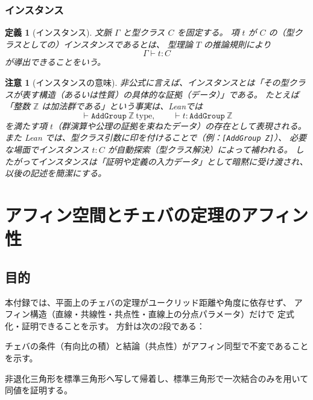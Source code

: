 \documentclass[a4paper,12pt]{bxjsbook}
\newlength{\customindent}
\newenvironment{body}{
  \par
  \begingroup
  \setlength{\leftskip}{\customindent}
  \setlength{\rightskip}{0pt}
  \setlength{\parindent}{1em}
  \setlength{\displayindent}{\customindent}
  \setlength{\displaywidth}{\dimexpr\linewidth-\customindent\relax}
}{
  \par
  \endgroup
}
\theoremstyle{theorem}
\newtheorem{definition}[theorem]{定義}
\newtheorem{remark}[theorem]{注意}
\begin{document}
    \subsection{インスタンス}
    \begin{definition}[インスタンス]
        文脈 $\Gamma$ と型クラス $C$ を固定する。
        項 $t$ が $C$ の（型クラスとしての）\emph{インスタンス}であるとは、
        型理論 $T$ の推論規則により
        \[
            \Gamma \vdash t : C
        \]
        が導出できることをいう。
    \end{definition}

    \begin{remark}[インスタンスの意味]
        非公式に言えば、インスタンスとは「その型クラスが表す構造（あるいは性質）の具体的な証拠（データ）」である。
        たとえば「整数 $\mathbb{Z}$ は加法群である」という事実は、Leanでは
        \[
            \vdash \texttt{AddGroup}\ \mathbb{Z}\ \text{type},\qquad \vdash t : \texttt{AddGroup}\ \mathbb{Z}
        \]
        を満たす項 $t$（群演算や公理の証拠を束ねたデータ）の存在として表現される。
        また Lean では、型クラス引数に印を付けることで（例：\texttt{[AddGroup Z]}）、 必要な場面でインスタンス $t:C$ が自動探索（型クラス解決）によって補われる。
        したがってインスタンスは「証明や定義の入力データ」として暗黙に受け渡され、以後の記述を簡潔にする。
    \end{remark}


    \chapter{アフィン空間とチェバの定理のアフィン性}

    \section{目的}
    \begin{body}
        \indent 本付録では、平面上のチェバの定理がユークリッド距離や角度に依存せず、 アフィン構造（直線・共線性・共点性・直線上の分点パラメータ）だけで 定式化・証明できることを示す。
        \indent 方針は次の2段である：
        \begin{bodyenumerate}
            \item チェバの条件（有向比の積）と結論（共点性）がアフィン同型で不変であることを示す。
            \item 非退化三角形を標準三角形へ写して帰着し、標準三角形で一次結合のみを用いて同値を証明する。
        \end{bodyenumerate}
    \end{body}
\end{document}
